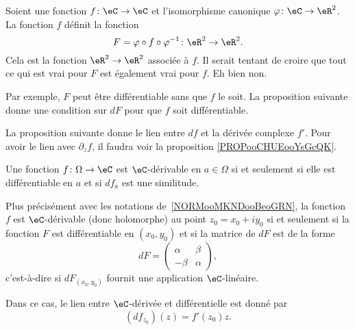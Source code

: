 \begin{normaltext}      \label{NORMooMKNDooBeoGRN}
	Soient une fonction \( f\colon \eC\to \eC\) et l'isomorphisme canonique \( \varphi\colon \eC\to \eR^2\). La fonction \( f\) définit la fonction
	\begin{equation}
        F=\varphi \circ f\circ \varphi^{-1}\colon \eR^2\to \eR^2.
	\end{equation}
	Cela est la fonction \( \eR^2\to \eR^2\) associée à \( f\). Il serait tentant de croire que tout ce qui est vrai pour \( F\) est également vrai pour \( f\). Eh bien non.

	Par exemple, \( F\) peut être différentiable sans que \( f\) le soit. La proposition suivante donne une condition sur \( dF\) pour que \( f\) soit différentiable.
\end{normaltext}

La proposition suivante donne le lien entre \( df\) et la dérivée complexe \( f'\). Pour avoir le lien avec \( \partial_zf\), il faudra voir la proposition \ref{PROPooCHUEooYsGcQK}.
\begin{proposition}     \label{PropKJUDooJfqgYS}
	Une fonction \( f\colon \Omega\to \eC\) est \( \eC\)-dérivable en \( a\in\Omega\) si et seulement si elle est différentiable en \( a\) et si \( df_a\) est une similitude.

	Plus précisément avec les notations de~\ref{NORMooMKNDooBeoGRN}, la fonction \( f\) est \( \eC\)-dérivable (donc holomorphe) au point \( z_0=x_0+iy_0\) si et seulement si la fonction \( F\) est différentiable en \( (x_0,y_0)\) et si la matrice de \( dF\) est de la forme
	\begin{equation}        \label{EQooWZGKooLDEHGr}
		dF=\begin{pmatrix}
			\alpha & \beta  \\
			-\beta & \alpha
		\end{pmatrix},
	\end{equation}
	c'est-à-dire si \( dF_{(x_0,y_0)}\) fournit une application \( \eC\)-linéaire.

	Dans ce cas, le lien entre \( \eC\)-dérivée et différentielle est donné par
	\begin{equation}        \label{EqPAEFooYNhYpz}
		(df_{z_0})(z)=f'(z_0)z.
	\end{equation}
\end{proposition}

